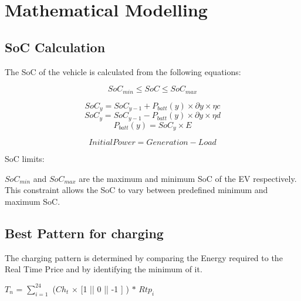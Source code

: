	\chapter{Mathematical Modelling}
	\label{chap:mathmodel}
	
	\section{SoC Calculation}
	
	
		
	The SoC of the vehicle is calculated from the following equations:
	

			\begin{equation}
		                             SoC_{min} \leq SoC \leq SoC_{max}\label{eq:socminmax}
		    \end{equation}

		    \begin{equation}                         
		               SoC_{y} = SoC_{y-1} + P_{batt}(y) \times \partial y \times \eta c
			\end{equation}
		    \begin{equation}             
		               SoC_{y} = SoC_{y-1} - P_{batt}(y) \times \partial y \times \eta d
			\end{equation}
		    \begin{equation}             
		               P_{batt}(y) = SoC_{y} \times E
		    \end{equation}
		 
\begin{equation}             
	 Initial Power = Generation - Load
\end{equation}

	  SoC limits:  
	 
	   $SoC_{min}$ and $SoC_{max}$ are  the maximum and minimum SoC of the EV respectively.
	   This constraint allows the SoC to vary between predefined minimum and maximum SoC.               
	
	\section{Best Pattern for charging}
	
	
	The charging pattern is determined by comparing the Energy required to the Real Time Price and by  identifying the minimum of it. 
	
	\begin{center}
		
		$T_{n}$ = $\sum^{24}_{i=1}$ ($Ch_{t} $ $\times$ [1 || 0 || -1 ] ) $\ast $ $Rtp_{i}$ 
    \end{center}	 
